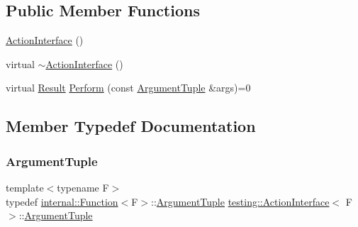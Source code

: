 \subsection*{Public Member Functions}
\begin{DoxyCompactItemize}
\item 
\hyperlink{classtesting_1_1_action_interface_a0f1d44e4c669a9cae5ee5b28419a6f52}{Action\+Interface} ()
\item 
virtual \hyperlink{classtesting_1_1_action_interface_a7dd0a5fc93d86ae3c9d04963b9f3a93f}{$\sim$\+Action\+Interface} ()
\item 
virtual \hyperlink{classtesting_1_1_action_interface_a7477de2fe3e4e01c59db698203acaee7}{Result} \hyperlink{classtesting_1_1_action_interface_a20f8624fcea1786f2992b358760422a0}{Perform} (const \hyperlink{classtesting_1_1_action_interface_af72720d864da4d606629e83edc003511}{Argument\+Tuple} \&args)=0
\end{DoxyCompactItemize}


\subsection{Member Typedef Documentation}
\mbox{\label{classtesting_1_1_action_interface_af72720d864da4d606629e83edc003511}} 
\subsubsection{\texorpdfstring{Argument\+Tuple}{ArgumentTuple}}
{\footnotesize\ttfamily template$<$typename F$>$ \\
typedef \hyperlink{structtesting_1_1internal_1_1_function}{internal\+::\+Function}$<$F$>$\+::\hyperlink{classtesting_1_1_action_interface_af72720d864da4d606629e83edc003511}{Argument\+Tuple} \hyperlink{classtesting_1_1_action_interface}{testing\+::\+Action\+Interface}$<$ F $>$\+::\hyperlink{classtesting_1_1_action_interface_af72720d864da4d606629e83edc003511}{Argument\+Tuple}}

\mbox{\label{classtesting_1_1_action_interface_a7477de2fe3e4e01c59db698203acaee7}} 
